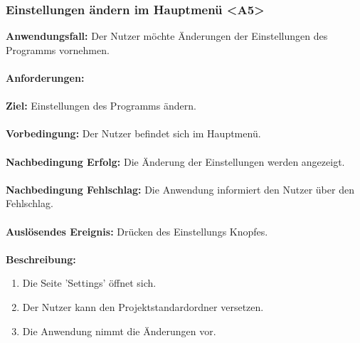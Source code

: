 \documentclass[parskip=full]{scrartcl} %
\begin{document}
\subsubsection*{Einstellungen ändern im Hauptmenü <A5>}
\textbf{Anwendungsfall:} Der Nutzer möchte Änderungen der Einstellungen des Programms vornehmen. \\\\
\textbf{Anforderungen:} \\\\
\textbf{Ziel:} Einstellungen des Programms ändern.\\\\
\textbf{Vorbedingung:}  Der Nutzer befindet sich im Hauptmenü.  \\\\
\textbf{Nachbedingung Erfolg:} Die Änderung der Einstellungen werden angezeigt.\\\\
\textbf{Nachbedingung Fehlschlag:} Die Anwendung informiert den Nutzer über den Fehlschlag.\\\\
\textbf{Auslösendes Ereignis:} Drücken des Einstellungs Knopfes. \\\\
\textbf{Beschreibung:}
\begin{enumerate}
    \item Die Seite 'Settings' öffnet sich.
    \item Der Nutzer kann den Projektstandardordner versetzen.
    \item Die Anwendung nimmt die Änderungen vor.
\end{enumerate}
\newpage
\end{document}
